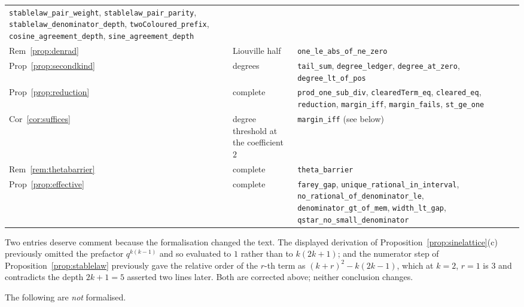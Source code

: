 \documentclass[11pt]{article}
\theoremstyle{plain}
\theoremstyle{definition}
\theoremstyle{remark}
\begin{document}
\begin{center}
\begin{tabular}{@{}ll>{\raggedright\arraybackslash}p{7.2cm}@{}}
  \texttt{stablelaw\_pair\_weight}, \texttt{stablelaw\_pair\_parity},
  \texttt{stablelaw\_denominator\_depth}, \texttt{twoColoured\_prefix},
  \texttt{cosine\_agreement\_depth}, \texttt{sine\_agreement\_depth}\\
Rem~\ref{prop:denrad} & Liouville half & \texttt{one\_le\_abs\_of\_ne\_zero}\\
Prop~\ref{prop:secondkind} & degrees & \texttt{tail\_sum}, \texttt{degree\_ledger},
  \texttt{degree\_at\_zero}, \texttt{degree\_lt\_of\_pos}\\
Prop~\ref{prop:reduction} & complete & \texttt{prod\_one\_sub\_div}, \texttt{clearedTerm\_eq},
  \texttt{cleared\_eq}, \texttt{reduction}, \texttt{margin\_iff}, \texttt{margin\_fails},
  \texttt{st\_ge\_one}\\
Cor~\ref{cor:suffices} & degree threshold at the coefficient $2$ & \texttt{margin\_iff}
  (see below)\\
Rem~\ref{rem:thetabarrier} & complete & \texttt{theta\_barrier}\\
Prop~\ref{prop:effective} & complete & \texttt{farey\_gap},
  \texttt{unique\_rational\_in\_interval}, \texttt{no\_rational\_of\_denominator\_le},
  \texttt{denominator\_gt\_of\_mem}, \texttt{width\_lt\_gap},
  \texttt{qstar\_no\_small\_denominator}\\
\hline
\end{tabular}
\end{center}

\medskip
Two entries deserve comment because the formalisation changed the text. The displayed derivation
of Proposition~\ref{prop:sinelattice}(c) previously omitted the prefactor $q^{k(k-1)}$ and so
evaluated to $1$ rather than to $k(2k+1)$; and the numerator step of
Proposition~\ref{prop:stablelaw} previously gave the relative order of the $r$-th term as
$(k+r)^2-k(2k-1)$, which at $k=2$, $r=1$ is $3$ and contradicts the depth $2k+1=5$ asserted two
lines later. Both are corrected above; neither conclusion changes.

\medskip
\noindent The following are \emph{not} formalised.
\end{document}

